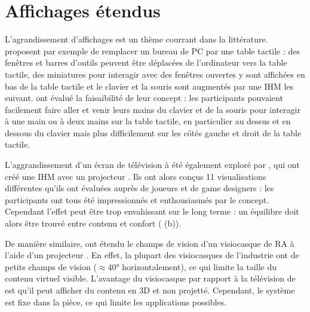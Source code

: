 \section{Affichages étendus}
L'agrandissement d'affichages est un thème courrant dans la littérature. \cite{Bi2011} proposent par exemple de remplacer un bureau de PC par une table tactile  : des fenêtres et barres d'outils peuvent être déplacées de l'ordinateur vers la table tactile, des miniatures pour interagir avec des fenêtres ouvertes y sont affichées en bas de la table tactile et le clavier et la souris sont augmentés par une IHM les suivant. \citeauthor{Bi2011} ont évalué la faisaibilité de leur concept : les participants pouvaient facilement faire aller et venir leurs mains du clavier et de la souris pour interagir à une main ou à deux mains sur la table tactile, en particulier au dessus et en dessous du clavier mais plus difficilement sur les côtés gauche et droit de la table tactile.


L'aggrandissement d'un écran de télévision à été également exploré par \cite{Jones2013}, qui ont créé une IHM  avec un projecteur . Ils ont alors conçus 11 visualisations différentes qu'ils ont évaluées auprès de joueurs et de game designers : les participants ont tous été impressionnés et enthousiasmés par le concept. Cependant l'effet peut être trop envahissant sur le long terme : un équilibre doit alors être trouvé entre contenu et confort ( (b)).


De manière similaire, \cite{Benko2015} ont étendu le champs de vision d'un visiocasque de RA à l'aide d'un projecteur . En effet, la plupart des visiocasques de l'industrie ont de petits champs de vision ($\approx$\ang{40} horizontalement), ce qui limite la taille du contenu virtuel visible. L'avantage du visiocasque par rapport à la télévision de \cite{Jones2013} est qu'il peut afficher du contenu en 3D et non projetté. Cependant, le système est fixe dans la pièce, ce qui limite les applications possibles.

